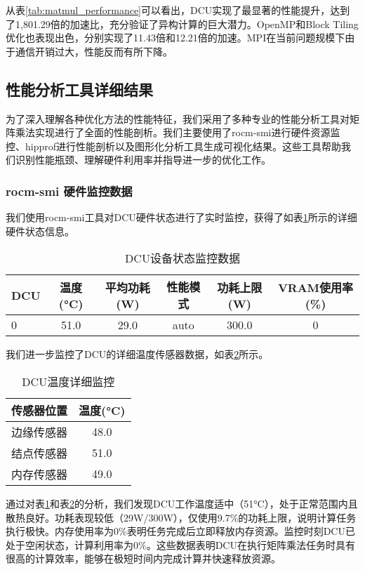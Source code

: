 \documentclass[12pt,a4paper]{article}
\begin{document}
从表\ref{tab:matmul_performance}可以看出，DCU实现了最显著的性能提升，达到了1,801.29倍的加速比，充分验证了异构计算的巨大潜力。OpenMP和Block Tiling优化也表现出色，分别实现了11.43倍和12.21倍的加速。MPI在当前问题规模下由于通信开销过大，性能反而有所下降。

\subsection{性能分析工具详细结果}

为了深入理解各种优化方法的性能特征，我们采用了多种专业的性能分析工具对矩阵乘法实现进行了全面的性能剖析。我们主要使用了rocm-smi进行硬件资源监控、hipprof进行性能剖析以及图形化分析工具生成可视化结果。这些工具帮助我们识别性能瓶颈、理解硬件利用率并指导进一步的优化工作。

\subsubsection{rocm-smi 硬件监控数据}

我们使用rocm-smi工具对DCU硬件状态进行了实时监控，获得了如表\ref{tab:rocm_smi_data}所示的详细硬件状态信息。

\begin{table}[H]
\centering
\caption{DCU设备状态监控数据}
\label{tab:rocm_smi_data}
\begin{tabular}{lccccc}
\toprule
DCU & 温度(°C) & 平均功耗(W) & 性能模式 & 功耗上限(W) & VRAM使用率(\%) \\
\midrule
0 & 51.0 & 29.0 & auto & 300.0 & 0 \\
\bottomrule
\end{tabular}
\end{table}

我们进一步监控了DCU的详细温度传感器数据，如表\ref{tab:dcu_temperature}所示。

\begin{table}[H]
\centering
\caption{DCU温度详细监控}
\label{tab:dcu_temperature}
\begin{tabular}{lc}
\toprule
传感器位置 & 温度(°C) \\
\midrule
边缘传感器 & 48.0 \\
结点传感器 & 51.0 \\
内存传感器 & 49.0 \\
\bottomrule
\end{tabular}
\end{table}

通过对表\ref{tab:rocm_smi_data}和表\ref{tab:dcu_temperature}的分析，我们发现DCU工作温度适中（51°C），处于正常范围内且散热良好。功耗表现较低（29W/300W），仅使用9.7\%的功耗上限，说明计算任务执行极快。内存使用率为0\%表明任务完成后立即释放内存资源。监控时刻DCU已处于空闲状态，计算利用率为0\%。这些数据表明DCU在执行矩阵乘法任务时具有很高的计算效率，能够在极短时间内完成计算并快速释放资源。
\end{document}
